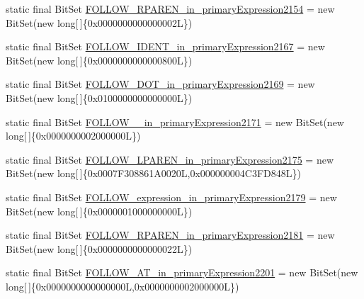 \begin{DoxyCompactItemize}
\item 
static final Bit\-Set \hyperlink{classorg_1_1tzi_1_1use_1_1parser_1_1shell_1_1_shell_command_parser_a1139220dcbd85559d3cae7e190d81ea3}{F\-O\-L\-L\-O\-W\-\_\-\-R\-P\-A\-R\-E\-N\-\_\-in\-\_\-primary\-Expression2154} = new Bit\-Set(new long\mbox{[}$\,$\mbox{]}\{0x0000000000000002\-L\})
\item 
static final Bit\-Set \hyperlink{classorg_1_1tzi_1_1use_1_1parser_1_1shell_1_1_shell_command_parser_a22fb2e0c9faae2ceed06bcd47e04d397}{F\-O\-L\-L\-O\-W\-\_\-\-I\-D\-E\-N\-T\-\_\-in\-\_\-primary\-Expression2167} = new Bit\-Set(new long\mbox{[}$\,$\mbox{]}\{0x0000000000000800\-L\})
\item 
static final Bit\-Set \hyperlink{classorg_1_1tzi_1_1use_1_1parser_1_1shell_1_1_shell_command_parser_a50018ca5925776fa77c2f76dd1eda1e0}{F\-O\-L\-L\-O\-W\-\_\-\-D\-O\-T\-\_\-in\-\_\-primary\-Expression2169} = new Bit\-Set(new long\mbox{[}$\,$\mbox{]}\{0x0100000000000000\-L\})
\item 
static final Bit\-Set \hyperlink{classorg_1_1tzi_1_1use_1_1parser_1_1shell_1_1_shell_command_parser_aea61bdffdc8588a25fd8a8dcb4965e45}{F\-O\-L\-L\-O\-W\-\_\-\_\-in\-\_\-primary\-Expression2171} = new Bit\-Set(new long\mbox{[}$\,$\mbox{]}\{0x0000000002000000\-L\})
\item 
static final Bit\-Set \hyperlink{classorg_1_1tzi_1_1use_1_1parser_1_1shell_1_1_shell_command_parser_a729c970ed78706da54b90aeeecdbd06b}{F\-O\-L\-L\-O\-W\-\_\-\-L\-P\-A\-R\-E\-N\-\_\-in\-\_\-primary\-Expression2175} = new Bit\-Set(new long\mbox{[}$\,$\mbox{]}\{0x0007\-F308861\-A0020\-L,0x000000004\-C3\-F\-D848\-L\})
\item 
static final Bit\-Set \hyperlink{classorg_1_1tzi_1_1use_1_1parser_1_1shell_1_1_shell_command_parser_a9c561a4f71cb75c74c2bf576e48bb090}{F\-O\-L\-L\-O\-W\-\_\-expression\-\_\-in\-\_\-primary\-Expression2179} = new Bit\-Set(new long\mbox{[}$\,$\mbox{]}\{0x0000001000000000\-L\})
\item 
static final Bit\-Set \hyperlink{classorg_1_1tzi_1_1use_1_1parser_1_1shell_1_1_shell_command_parser_a4cf4925774b864276c349978f5a3167f}{F\-O\-L\-L\-O\-W\-\_\-\-R\-P\-A\-R\-E\-N\-\_\-in\-\_\-primary\-Expression2181} = new Bit\-Set(new long\mbox{[}$\,$\mbox{]}\{0x0000000000000022\-L\})
\item 
static final Bit\-Set \hyperlink{classorg_1_1tzi_1_1use_1_1parser_1_1shell_1_1_shell_command_parser_a6c21caf830845dcd6ed0cace1f2555b8}{F\-O\-L\-L\-O\-W\-\_\-\-A\-T\-\_\-in\-\_\-primary\-Expression2201} = new Bit\-Set(new long\mbox{[}$\,$\mbox{]}\{0x0000000000000000\-L,0x0000000002000000\-L\})

\end{DoxyCompactItemize}
